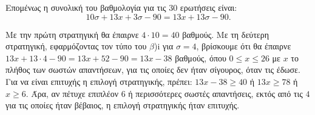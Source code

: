 \begin{alist}
\begin{rlist}
Επομένως η συνολική του βαθμολογία για τις $30$ ερωτήσεις είναι:
\[10\sigma + 13x + 3\sigma - 90 = 13x + 13\sigma - 90.\]
\item Με την πρώτη στρατηγική θα έπαιρνε $4 \cdot 10 = 40$ βαθμούς.
Με τη δεύτερη στρατηγική, εφαρμόζοντας τον τύπο του $\beta$)i για $\sigma = 4$, βρίσκουμε ότι θα
έπαιρνε $13x + 13 \cdot 4 - 90 = 13x + 52 - 90 = 13x - 38$ βαθμούς, όπου $0 \le x \le 26$ με $x$ το πλήθος των
σωστών απαντήσεων, για τις οποίες δεν ήταν σίγουρος, όταν τις έδωσε.
Για να είναι επιτυχής η επιλογή στρατηγικής, πρέπει:
$13x - 38 \ge 40$ ή $13x \ge 78$ ή $x \ge 6$.
Άρα, αν πέτυχε επιπλέον $6$ ή περισσότερες σωστές απαντήσεις, εκτός από τις $4$ για τις
οποίες ήταν βέβαιος, η επιλογή στρατηγικής ήταν επιτυχής.
\end{rlist}
\end{alist}

